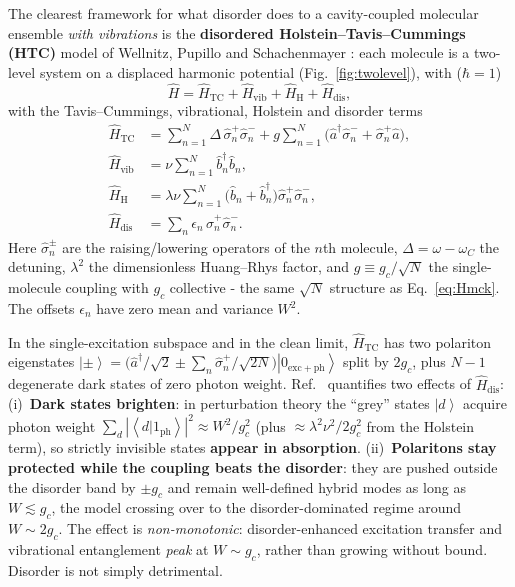 \documentclass[12pt,a4paper]{article}
\newcommand{\ket}[1]{\left|#1\right\rangle}
\newcommand{\braket}[1]{\left\langle#1\right\rangle}
\begin{document}
The clearest framework for what disorder does to a cavity-coupled
molecular ensemble \emph{with vibrations} is the \textbf{disordered
Holstein--Tavis--Cummings (HTC)} model of Wellnitz, Pupillo and Schachenmayer
\cite{Wellnitz2022}: each molecule is a two-level system on a displaced
harmonic potential (Fig.~\ref{fig:twolevel}), with ($\hbar=1$)
\begin{equation}
  \hat H=\hat H_{\mathrm{TC}}+\hat H_{\mathrm{vib}}
        +\hat H_{\mathrm{H}}+\hat H_{\mathrm{dis}},
  \label{eq:HTC_total}
\end{equation}
with the Tavis--Cummings, vibrational, Holstein and disorder terms
\begin{align}
  \hat H_{\mathrm{TC}}&=\sum_{n=1}^{N}\Delta\,\hat\sigma^+_n\hat\sigma^-_n
     +g\sum_{n=1}^{N}\big(\hat a^\dagger\hat\sigma^-_n+\hat\sigma^+_n\hat a\big),
     \label{eq:HTC}\\
  \hat H_{\mathrm{vib}}&=\nu\sum_{n=1}^{N}\hat b^\dagger_n\hat b_n,
     \label{eq:Hvib}\\
  \hat H_{\mathrm{H}}&=\lambda\nu\sum_{n=1}^{N}
     \big(\hat b_n+\hat b^\dagger_n\big)\hat\sigma^+_n\hat\sigma^-_n,
     \label{eq:HH}\\
  \hat H_{\mathrm{dis}}&=\sum_n\epsilon_n\,\hat\sigma^+_n\hat\sigma^-_n .
     \label{eq:Hdis}
\end{align}
Here $\hat\sigma^\pm_n$ are the raising/lowering operators of the $n$th
molecule, $\Delta=\omega-\omega_C$ the detuning, $\lambda^2$ the dimensionless
Huang--Rhys factor, and $g\equiv g_c/\sqrt N$ the single-molecule coupling with
$g_c$ collective - the same $\sqrt N$ structure as Eq.~\eqref{eq:Hmck}. The
offsets $\epsilon_n$ have zero mean and variance $W^2$.

In the single-excitation subspace and in the clean limit,
$\hat H_{\mathrm{TC}}$ has two polariton eigenstates
$\ket{\pm}=\big(\hat a^\dagger/\sqrt2\pm\sum_n\hat\sigma^+_n/\sqrt{2N}\big)
\ket{0_{\mathrm{exc+ph}}}$ split by $2g_c$, plus $N-1$ degenerate dark states
of zero photon weight. Ref.~\cite{Wellnitz2022} quantifies two effects of
$\hat H_{\mathrm{dis}}$:
(i)~\textbf{Dark states brighten}: in perturbation theory the ``grey'' states
$\ket{d}$ acquire photon weight
$\sum_d|\braket{d|1_{\mathrm{ph}}}|^2\approx W^2/g_c^2$ (plus
$\approx\lambda^2\nu^2/2g_c^2$ from the Holstein term), so strictly invisible
states \textbf{appear in absorption}. (ii)~\textbf{Polaritons stay protected
while the coupling beats the disorder}: they are pushed outside the disorder
band by $\pm g_c$ and remain well-defined hybrid modes as long as
$W\lesssim g_c$, the model crossing over to the disorder-dominated regime
around $W\sim2g_c$.
The effect is \emph{non-monotonic}: disorder-enhanced excitation
transfer and vibrational entanglement \emph{peak} at $W\sim g_c$, rather than
growing without bound. Disorder is not simply detrimental.
\end{document}
